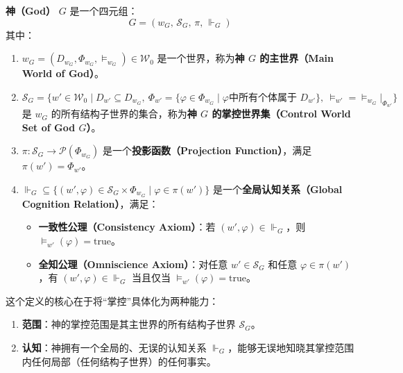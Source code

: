 \begin{definition}[神]\label{def:god}
    \textbf{神（God）} \(G\) 是一个四元组：
    \begin{equation}
        G = (w_G, \, \mathcal{S}_G, \, \pi, \, \Vdash_G)
    \end{equation}
    其中：
    \begin{enumerate}
        \item \( w_G = (D_{w_G}, \Phi_{w_G}, \models_{w_G}) \in \mathcal{W}_0 \) 是一个世界，称为\textbf{神 \(G\) 的主世界（Main World of God）}。
        \item \( \mathcal{S}_G = \{ w' \in \mathcal{W}_0 \mid D_{w'} \subseteq D_{w_G},\ \Phi_{w'} = \{\varphi \in \Phi_{w_G} \mid \text{$\varphi$中所有个体属于 } D_{w'}\},\ \models_{w'} = \models_{w_G}|_{\Phi_{w'}} \} \)
              是 \( w_G \) 的所有结构子世界的集合，称为\textbf{神 \(G\) 的掌控世界集（Control World Set of God \(G\)）}。
        \item \( \pi: \mathcal{S}_G \to \mathcal{P}(\Phi_{w_G}) \) 是一个\textbf{投影函数（Projection Function）}，满足 \( \pi(w') = \Phi_{w'} \)。
        \item \( \Vdash_G \subseteq \{ (w', \varphi) \in \mathcal{S}_G \times \Phi_{w_G} \mid \varphi \in \pi(w') \} \) 是一个\textbf{全局认知关系（Global Cognition Relation）}，满足：
              \begin{itemize}
                  \item \textbf{一致性公理（Consistency Axiom）}：若 \( (w', \varphi) \in \Vdash_G \)，则 \( \models_{w'}(\varphi) = \text{true} \)。
                  \item \textbf{全知公理（Omniscience Axiom）}：对任意 \( w' \in \mathcal{S}_G \) 和任意 \( \varphi \in \pi(w') \)，有 \( (w', \varphi) \in \Vdash_G \) 当且仅当 \( \models_{w'}(\varphi) = \text{true} \)。
              \end{itemize}
    \end{enumerate}
\end{definition}

\begin{remark}
    这个定义的核心在于将“掌控”具体化为两种能力：
    \begin{enumerate}
        \item \textbf{范围}：神的掌控范围是其主世界的所有结构子世界 \( \mathcal{S}_G \)。
        \item \textbf{认知}：神拥有一个全局的、无误的认知关系 \( \Vdash_G \)，能够无误地知晓其掌控范围内任何局部（任何结构子世界）的任何事实。
    \end{enumerate}
\end{remark}

